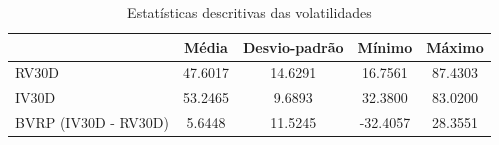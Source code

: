 \begin{table}
\caption{Estatísticas descritivas das volatilidades}
\label{tab:estatisticas_vols}
\begin{tabular}{lcccc}
\toprule
 & Média & Desvio-padrão & Mínimo & Máximo \\
\midrule
RV30D & 47.6017 & 14.6291 & 16.7561 & 87.4303 \\
IV30D & 53.2465 & 9.6893 & 32.3800 & 83.0200 \\
BVRP (IV30D - RV30D) & 5.6448 & 11.5245 & -32.4057 & 28.3551 \\
\bottomrule
\end{tabular}
\end{table}
